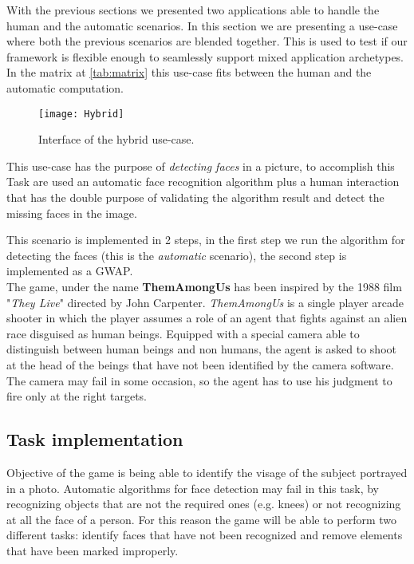 
With the previous sections we presented two applications able to handle the
human and the automatic scenarios. In this section we are presenting a use-case
where both the previous scenarios are blended together. This is used to test
if our framework is flexible enough to seamlessly support mixed application
archetypes. In the matrix at \autoref{tab:matrix} this use-case fits between the
human and the automatic computation.

\begin{figure}[htb]
    \centering
    \texttt{[image: Hybrid]}
    \caption{Interface of the hybrid use-case.}
    \label{fig:Hybrid1}
\end{figure}

This use-case has the purpose of \emph{detecting faces} in a picture, to accomplish
this Task are used an automatic face recognition algorithm plus a human interaction
that has the double purpose of validating the algorithm result and detect the
missing faces in the image.

This scenario is implemented in 2 steps, in the first step we run the algorithm
for detecting the faces (this is the \emph{automatic} scenario), the second step
is implemented as a \ac{GWAP}.\\

The game, under the name \textbf{ThemAmongUs} has been inspired by the 1988
film "\emph{They Live}" directed by John Carpenter. \emph{ThemAmongUs} is a
single player arcade shooter in which the player assumes a role of an agent that
fights against an alien race disguised as human beings. Equipped with a special
camera able to distinguish between human beings and non humans, the agent is
asked to shoot at the head of the beings that have not been identified by the
camera software. The camera may fail in some occasion, so the agent has to use
his judgment to fire only at the right targets.

\subsection{Task implementation}
Objective of the game is being able to identify the visage of the subject
portrayed in a photo. Automatic algorithms for face detection may fail in this
task, by recognizing objects that are not the required ones (e.g. knees) or not
recognizing at all the face of a person. For this reason the game will be able
to perform two different tasks: identify faces that have not been recognized and
remove elements that have been marked improperly.

